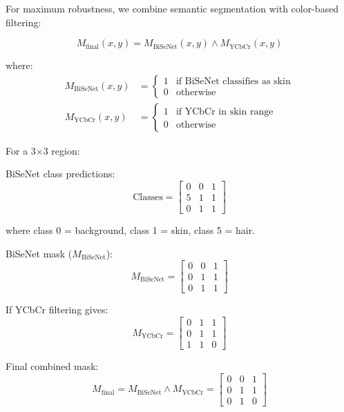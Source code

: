 \documentclass[11pt,a4paper]{article}
\begin{document}
For maximum robustness, we combine semantic segmentation with color-based filtering:

\begin{equation}
M_{\text{final}}(x, y) = M_{\text{BiSeNet}}(x, y) \land M_{\text{YCbCr}}(x, y)
\end{equation}

where:
\begin{align}
M_{\text{BiSeNet}}(x,y) &= \begin{cases} 1 & \text{if BiSeNet classifies as skin} \\ 0 & \text{otherwise} \end{cases} \\
M_{\text{YCbCr}}(x,y) &= \begin{cases} 1 & \text{if YCbCr in skin range} \\ 0 & \text{otherwise} \end{cases}
\end{align}

\begin{tcolorbox}[colback=green!5!white,colframe=green!75!black,title=Example: BiSeNet Output]
For a 3×3 region:

BiSeNet class predictions:
\[
\text{Classes} = \begin{bmatrix}
0 & 0 & 1 \\
5 & 1 & 1 \\
0 & 1 & 1
\end{bmatrix}
\]

where class 0 = background, class 1 = skin, class 5 = hair.

BiSeNet mask ($M_{\text{BiSeNet}}$):
\[
M_{\text{BiSeNet}} = \begin{bmatrix}
0 & 0 & 1 \\
0 & 1 & 1 \\
0 & 1 & 1
\end{bmatrix}
\]

If YCbCr filtering gives:
\[
M_{\text{YCbCr}} = \begin{bmatrix}
0 & 1 & 1 \\
0 & 1 & 1 \\
1 & 1 & 0
\end{bmatrix}
\]

Final combined mask:
\[
M_{\text{final}} = M_{\text{BiSeNet}} \land M_{\text{YCbCr}} = \begin{bmatrix}
0 & 0 & 1 \\
0 & 1 & 1 \\
0 & 1 & 0
\end{bmatrix}
\]
\end{tcolorbox}
\end{document}
